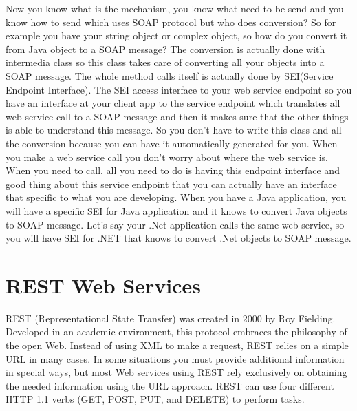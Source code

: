 Now you know what is the mechanism, you know what need to be send and you know how to send which uses SOAP protocol but who does conversion? So for example you have your string object or complex object, so how do you convert it from Java object to a SOAP message? The conversion is actually done with intermedia class so this class takes care of converting all your objects into a SOAP message. The whole method calls itself is actually done by SEI(Service Endpoint Interface)\citep{thesis:state5}. The SEI access interface to your web service endpoint so you have an interface at your client app to the service endpoint which translates all web service call to a SOAP message and then it makes sure that the other things is able to understand this message. So you don’t have to write this class and all the conversion because you can have it automatically generated for you. When you make a web service call you don’t worry about where the web service is. When you need to call, all you need to do is having this endpoint interface and good thing about this service endpoint that you can actually have an interface that specific to what you are developing. When you have a Java application, you will have a specific SEI for Java application and it knows to convert Java objects to SOAP message. Let’s say your .Net application calls the same web service, so you will have SEI for .NET that knows to convert .Net objects to SOAP message.

\section{REST Web Services}
\label{section:rest}
REST (Representational State Transfer) was created in 2000 by Roy Fielding\citep{thesis:state5_1}. Developed in an academic environment, this protocol embraces the philosophy of the open Web. Instead of using XML to make a request, REST relies on a simple URL in many cases. In some situations you must provide additional information in special ways, but most Web services using REST rely exclusively on obtaining the needed information using the URL approach. REST can use four different HTTP 1.1 verbs (GET, POST, PUT, and DELETE) to perform tasks.

